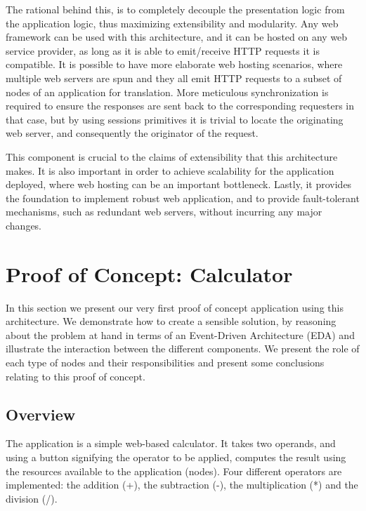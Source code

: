 \documentclass[12pt, titlepage]{uo_temp}
\begin{document}
     The rational behind this, is to completely decouple the presentation logic from the
     application logic, thus maximizing extensibility and modularity. Any web framework
     can be used with this architecture, and it can be hosted on any web service
     provider, as long as it is able to emit/receive HTTP requests it is compatible.
     It is possible to have more elaborate web hosting scenarios, where multiple web
     servers are spun and they all emit HTTP requests to a subset of nodes of an
     application for translation. More meticulous synchronization is required to ensure
     the responses are sent back to the corresponding requesters in that case, but by
     using sessions primitives it is trivial to locate the originating web server, and
     consequently the originator of the request.

     This component is crucial to the claims of extensibility that this architecture
     makes. It is also important in order to achieve scalability for the application
     deployed, where web hosting can be an important bottleneck. Lastly, it provides the
     foundation to implement robust web application, and to provide fault-tolerant
     mechanisms, such as redundant web servers, without incurring any major changes.

     \section{Proof of Concept: Calculator}
     In this section we present our very first proof of concept application using this
     architecture. We demonstrate how to create a sensible solution, by reasoning about
     the problem at hand in terms of an Event-Driven Architecture (EDA) and illustrate the
     interaction between the different components. We present the role of each type of
     nodes and their responsibilities and present some conclusions relating to this proof
     of concept.

     \subsection{Overview}
     The application is a simple web-based calculator. It takes two operands, and
     using a button signifying the operator to be applied, computes the result using the
     resources available to the application (nodes). Four different operators are
     implemented: the addition (+), the subtraction (-), the multiplication (*) and the
     division (/).
\end{document}
